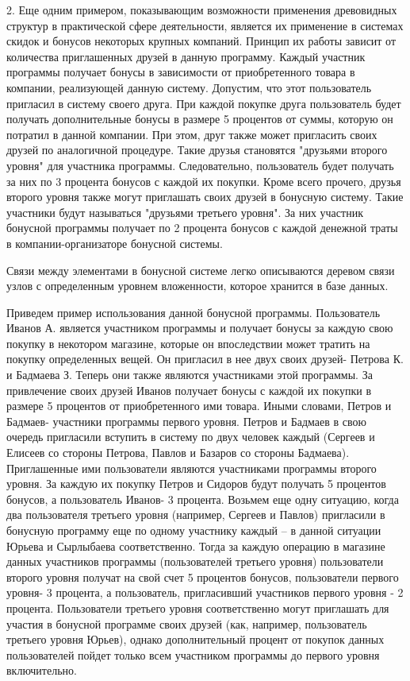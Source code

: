 \documentclass[a4paper,14pt]{extreport}
\theoremstyle{definition}
\begin{document}
2. Еще одним примером, показывающим возможности применения древовидных структур в практической сфере деятельности, является их применение в системах скидок и бонусов некоторых крупных компаний. Принцип их работы зависит от количества приглашенных друзей в данную программу. Каждый участник программы получает бонусы в зависимости от приобретенного товара в компании, реализующей данную систему. Допустим, что этот пользователь пригласил в систему своего друга. При каждой покупке друга пользователь будет получать дополнительные бонусы в размере 5 процентов от суммы, которую он потратил в данной компании. При этом, друг также может пригласить своих друзей по аналогичной процедуре. Такие друзья становятся "друзьями второго уровня" для участника программы. Следовательно, пользователь будет получать за них по 3 процента бонусов с каждой их покупки. Кроме всего прочего, друзья второго уровня также могут приглашать своих друзей в бонусную систему. Такие участники будут называться "друзьями третьего уровня". За них участник бонусной программы получает по 2 процента бонусов с каждой денежной траты в компании-организаторе бонусной системы.

Связи между элементами в бонусной системе легко описываются деревом связи узлов с определенным уровнем вложенности, которое хранится в базе данных.

Приведем пример использования данной бонусной программы. Пользователь Иванов А. является участником программы и получает бонусы за каждую свою покупку в некотором магазине, которые он впоследствии может тратить на покупку определенных вещей. Он пригласил в нее двух своих друзей- Петрова К. и Бадмаева З. Теперь они также являются участниками этой программы. За привлечение своих друзей Иванов получает бонусы с каждой их покупки в размере 5 процентов от приобретенного ими товара. Иными словами, Петров и Бадмаев- участники программы первого уровня. Петров и Бадмаев в свою очередь пригласили вступить в систему по двух человек каждый (Сергеев и Елисеев со стороны Петрова, Павлов и Базаров со стороны Бадмаева). Приглашенные ими пользователи являются участниками программы второго уровня. За каждую их покупку Петров и Сидоров будут получать 5 процентов бонусов, а пользователь Иванов- 3 процента. Возьмем еще одну ситуацию, когда два пользователя третьего уровня (например, Сергеев и Павлов) пригласили в бонусную программу еще по одному участнику каждый – в данной ситуации Юрьева и Сырлыбаева соответственно. Тогда за каждую операцию в магазине данных участников программы (пользователей третьего уровня) пользователи второго уровня получат на свой счет 5 процентов бонусов, пользователи первого уровня- 3 процента, а пользователь, пригласивший участников первого уровня - 2 процента. Пользователи третьего уровня соответственно могут приглашать для участия в бонусной программе своих друзей (как, например, пользователь третьего уровня Юрьев), однако дополнительный процент от покупок данных пользователей пойдет только всем участником программы до первого уровня включительно.
\end{document}
